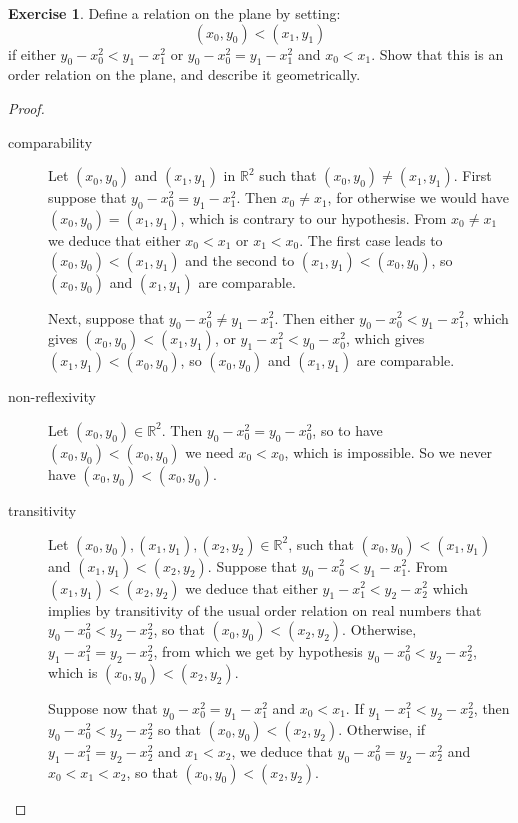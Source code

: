 \documentclass[11pt,a4paper,twoside]{article}
\theoremstyle{definition}
\newcounter{excounter}
\newtheorem{exercise}[excounter]{Exercise}
\begin{document}
\begin{exercise}

  Define a relation on the plane by setting:
  \begin{equation*}
    (x_0, y_0) < (x_1, y_1)
  \end{equation*}
  if either $y_0 - x_0^2 < y_1 - x_1^2$ or $y_0 - x_0^2 = y_1 - x_1^2$ and $x_0 < x_1$.
  Show that this is an order relation on the plane, and describe it geometrically.

\end{exercise}

\begin{proof}\hfill

  \begin{description}
  \item [comparability] Let $(x_0, y_0)$ and $(x_1, y_1)$ in $\mathbb{R}^2$ such that $(x_0, y_0) \neq (x_1, y_1)$.
    First suppose that $y_0 - x_0^2 = y_1 - x_1^2$. Then $x_0 \neq x_1$, for otherwise we would have $(x_0, y_0) = (x_1, y_1)$, which is contrary to our hypothesis.
    From $x_0 \neq x_1$ we deduce that either $x_0 < x_1$ or $x_1 < x_0$. The first case leads to $(x_0, y_0) < (x_1, y_1)$ and the second to $(x_1, y_1) < (x_0, y_0)$,
    so $(x_0, y_0)$ and $(x_1, y_1)$ are comparable.

    Next, suppose that $y_0 - x_0^2 \neq y_1 - x_1^2$. Then either $y_0 - x_0^2 < y_1 - x_1^2$, which gives $(x_0, y_0) < (x_1, y_1)$,
    or $y_1 - x_1^2 < y_0 - x_0^2$, which gives $(x_1, y_1) < (x_0, y_0)$, so $(x_0, y_0)$ and $(x_1, y_1)$ are comparable.

  \item [non-reflexivity] Let $(x_0, y_0) \in \mathbb{R}^2$. Then $y_0 - x_0^2 = y_0 - x_0^2$, so to have $(x_0, y_0) < (x_0, y_0)$ we need $x_0 < x_0$, which is impossible.
    So we never have $(x_0, y_0) < (x_0, y_0)$.

  \item [transitivity] Let $(x_0, y_0), (x_1, y_1), (x_2, y_2) \in \mathbb{R}^2$, such that $(x_0, y_0) < (x_1, y_1)$ and $(x_1, y_1) < (x_2, y_2)$.
    Suppose that $y_0 - x_0^2 < y_1 - x_1^2$. From $(x_1, y_1) < (x_2, y_2)$ we deduce that either $y_1 - x_1^2 < y_2 - x_2^2$ which implies by transitivity of the usual order
    relation on real numbers that $y_0 - x_0^2 < y_2 - x_2^2$, so that $(x_0, y_0) < (x_2, y_2)$.
    Otherwise, $y_1 - x_1^2 = y_2 - x_2^2$, from which we get by hypothesis $y_0 - x_0^2 < y_2 - x_2^2$, which is $(x_0, y_0) < (x_2, y_2)$.

    Suppose now that $y_0 - x_0^2 = y_1 - x_1^2$ and $x_0 < x_1$. If $y_1 - x_1^2 < y_2 - x_2^2$, then $y_0 - x_0^2 < y_2 - x_2^2$ so that $(x_0, y_0) < (x_2, y_2)$.
    Otherwise, if $y_1 - x_1^2 = y_2 - x_2^2$ and $x_1 < x_2$, we deduce that $y_0 - x_0^2 = y_2 - x_2^2$ and $x_0 < x_1 < x_2$, so that $(x_0, y_0) < (x_2 , y_2)$.


\end{description}
\end{proof}
\end{document}
